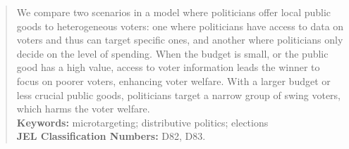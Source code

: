 \documentclass[12pt,english]{article}
\begin{document}
\begin{abstract}
{
We compare two scenarios in a model where politicians offer local public goods to heterogeneous voters: one where politicians have access to data on voters and thus can target specific ones, and another where politicians only decide on the level of spending. When the budget is small, or the public good has a high value, access to voter information leads the winner to focus on poorer voters, enhancing voter welfare. With a larger budget or less crucial public goods, politicians target a narrow group of swing voters, which harms the voter welfare.
}\\
 {\footnotesize{}{}{}{}{}{} }\textbf{\footnotesize{}{}{}{}{}{}Keywords:}{\footnotesize{}{}{}{}{}{}
microtargeting; distributive politics; elections}\\
 {\footnotesize{}{}{}{}{}{} }\textbf{\footnotesize{}{}{}{}{}{}JEL
Classification Numbers:}{\footnotesize{}{}{}{}{}{} D82, D83.}{\footnotesize\par}

 
\end{abstract}
\end{document}
